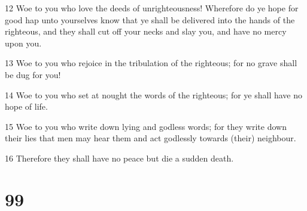 \par 12 Woe to you who love the deeds of unrighteousness! Wherefore do ye hope for good hap unto yourselves know that ye shall be delivered into the hands of the righteous, and they shall cut off your necks and slay you, and have no mercy upon you.
\par 13 Woe to you who rejoice in the tribulation of the righteous; for no grave shall be dug for you!
\par 14 Woe to you who set at nought the words of the righteous; for ye shall have no hope of life.
\par 15 Woe to you who write down lying and godless words; for they write down their lies that men may hear them and act godlessly towards (their) neighbour.
\par 16 Therefore they shall have no peace but die a sudden death.

\chapter{99}

